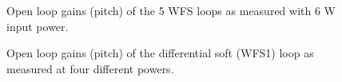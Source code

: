 \begin{figure}
\begin{centering}
\caption{Open loop gains (pitch) of the 5 WFS loops as measured with 6 W
  input power.}
\label{fig:olgs6W}
\end{centering}
\end{figure}


\begin{figure}
\begin{centering}
\caption{Open loop gains (pitch) of the differential soft (WFS1) loop as measured at four
  different powers.}
\label{fig:DSolgs}
\end{centering}
\end{figure}

